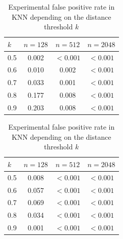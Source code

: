 \begin{table}[ht]
    \centering
    \begin{subtable}[t]{0.45\textwidth}
        \centering
        \caption{The random dataset}
        \begin{tabular}{lccc}
            \toprule
            \( k \) & \( n = 128 \) & \( n = 512 \) & \( n = 2048 \) \\
            \midrule
            0.5 & 0.002 & \( < 0.001 \) & \( < 0.001 \) \\
            0.6 & 0.010 & 0.002 & \( < 0.001 \) \\
            0.7 & 0.033 & 0.001 & \( < 0.001 \) \\
            0.8 & 0.177 & 0.008 & \( < 0.001 \) \\
            0.9 & 0.203 & 0.008 & \( < 0.001 \) \\
            \bottomrule
        \end{tabular}
    \end{subtable}%
    \hfill
    \begin{subtable}[t]{0.45\textwidth}
        \centering
        \caption{The hydrocarbon dataset}
        \begin{tabular}{lccc}
            \toprule
            \( k \) & \( n = 128 \) & \( n = 512 \) & \( n = 2048 \) \\
            \midrule
            0.5 & 0.008 & \( < 0.001 \) & \( < 0.001 \) \\
            0.6 & 0.057 & \( < 0.001 \) & \( < 0.001 \) \\
            0.7 & 0.069 & \( < 0.001 \) & \( < 0.001 \) \\
            0.8 & 0.034 & \( < 0.001 \) & \( < 0.001 \) \\
            0.9 & 0.001 & \( < 0.001 \) & \( < 0.001 \) \\
            \bottomrule
        \end{tabular}
    \end{subtable}
    \caption{Experimental false positive rate in KNN depending on the distance threshold \( k \)}
    \label{tab:knn-distance}
\end{table}


